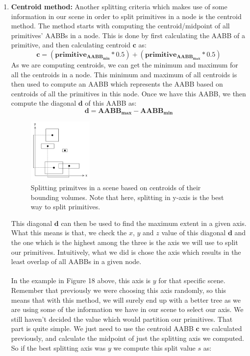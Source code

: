\documentclass[11pt,a4paper]{article}
\begin{document}
\begin{enumerate}
\item \textbf{Centroid method:}
Another splitting criteria which makes use of some information in our scene in order to split primitives in a node is the centroid method. The method starts with computing the centroid/midpoint of all primitives' AABBs in a node. This is done by first calculating the AABB of a primitive, and then calculating centroid $\boldsymbol{c}$ as:
\begin{equation}
\boldsymbol{c} = (\boldsymbol{primitive_{AABB_{min}}}*0.5)+(\boldsymbol{primitive_{AABB_{max}}}*0.5)
\end{equation}
As we are computing centroids, we can get the minimum and maximum for all the centroids in a node. This minimum and maximum of all centroids is then used to compute an AABB which represents the AABB based on centroids of all the primitives in this node. Once we have this AABB, we then compute the diagonal $\boldsymbol{d}$ of this AABB as:
\begin{equation}
\boldsymbol{d} = \boldsymbol{AABB_{max}} - \boldsymbol{AABB_{min}}
\end{equation}
\begin{figure}[H]
	\centering
	\captionsetup{justification=centering,margin=2cm}
	\includegraphics[width=0.3\textwidth]{centroid_bvh}
	\caption{Splitting primitves in a scene based on centroids of their bounding volumes. Note that here, splitting in y-axis is the best way to split primitives.\protect\cite{pharr2016physically}}
\end{figure}
This diagonal $\boldsymbol{d}$ can then be used to find the maximum extent in a given axis. What this means is that, we check the $x$, $y$ and $z$ value of this diagonal $\boldsymbol{d}$ and the one which is the highest among the three is the axis we will use to split our primitives. Intuitively, what we did is chose the axis which results in the least overlap of all AABBs in a given node. 
\\~\\
In the example in Figure 18 above, this axis is $y$ for that specific scene. Remember that previously we were choosing this axis randomly, so this means that with this method, we will surely end up with a better tree as we are using some of the information we have in our scene to select our axis. We still haven't decided the value which would partition our primitives. That part is quite simple. We just need to use the centroid AABB $\boldsymbol{c}$ we calculated previously, and calculate the midpoint of just the splitting axis we computed. So if the best splitting axis was $y$ we compute this split value $s$ as:

\end{enumerate}
\end{document}
